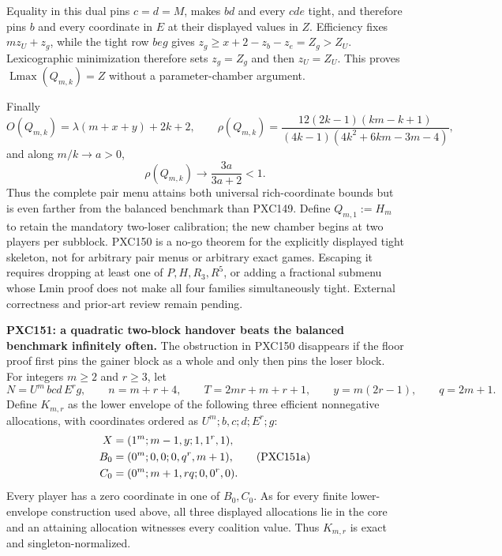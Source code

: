 \documentclass[11pt]{article}
\newcommand{\Lmax}{\operatorname{Lmax}}
\begin{document}
Equality in this dual pins \(c=d=M\), makes \(bd\) and every \(cde\) tight,
and therefore pins \(b\) and every coordinate in \(E\) at their displayed
values in \(Z\).  Efficiency fixes \(m z_U+z_g\), while the tight row
\(beg\) gives \(z_g\ge x+2-z_b-z_e=Z_g>Z_U\).  Lexicographic minimization
therefore sets \(z_g=Z_g\) and then \(z_U=Z_U\).  This proves
\(\Lmax(Q_{m,k})=Z\) without a parameter-chamber argument.

Finally
\begin{equation}
 O(Q_{m,k})=\lambda(m+x+y)+2k+2,\qquad
 \rho(Q_{m,k})=
 \frac{12(2k-1)(km-k+1)}{(4k-1)(4k^2+6km-3m-4)},       \tag{PXC150e}
\end{equation}
and along \(m/k\to a>0\),
\[
 \rho(Q_{m,k})\longrightarrow\frac{3a}{3a+2}<1.
\]
Thus the complete pair menu attains both universal rich-coordinate bounds
but is even farther from the balanced benchmark than PXC149.  Define
\(Q_{m,1}:=H_m\) to retain the mandatory two-loser calibration; the
new chamber begins at two players per subblock.  PXC150 is a no-go theorem
for the explicitly displayed tight skeleton, not for arbitrary pair menus
or arbitrary exact games.  Escaping it requires dropping at least one of
\(P,H,R_3,R^5\), or adding a fractional submenu whose Lmin proof does not
make all four families simultaneously tight.  External correctness and
prior-art review remain pending.

\medskip
\noindent\textbf{PXC151: a quadratic two-block handover beats the balanced
benchmark infinitely often.}
The obstruction in PXC150 disappears if the floor proof first pins the
gainer block as a whole and only then pins the loser block.  For integers
\(m\ge2\) and \(r\ge3\), let
\[
 N=U^m\,bcd\,E^r g,\qquad n=m+r+4,\qquad
 T=2mr+m+r+1,\qquad y=m(2r-1),\qquad q=2m+1.
\]
Define \(K_{m,r}\) as the lower envelope of the following three efficient
nonnegative allocations, with coordinates ordered as
\(U^m;b,c;d;E^r;g\):
\begin{align}
 X&=(1^m;m-1,y;1,1^r,1),\notag\\
 B_0&=(0^m;0,0;0,q^r,m+1),                         \tag{PXC151a}\\
 C_0&=(0^m;m+1,rq;0,0^r,0).\notag
\end{align}
Every player has a zero coordinate in one of \(B_0,C_0\).  As for every
finite lower-envelope construction used above, all three displayed
allocations lie in the core and an attaining allocation witnesses every
coalition value.  Thus \(K_{m,r}\) is exact and singleton-normalized.
\end{document}

